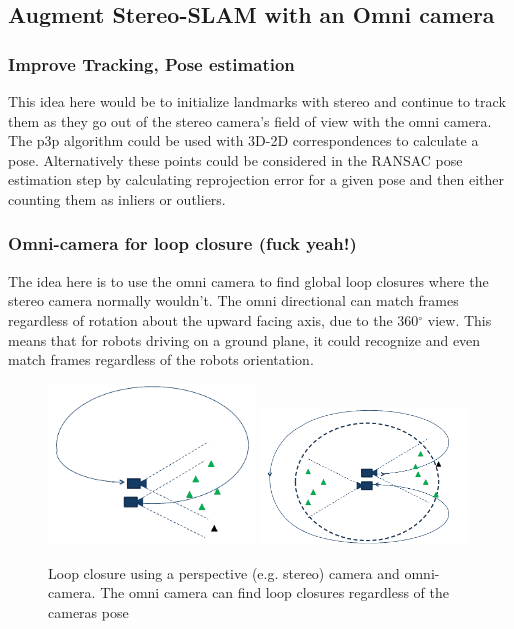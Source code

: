 \subsection{Augment Stereo-SLAM with an Omni camera}

\subsubsection{Improve Tracking, Pose estimation}

This idea here would be to initialize landmarks with stereo and continue to track them as they go out of the stereo camera's field of view with the omni camera.  The p3p algorithm could be used with 3D-2D correspondences to calculate a pose.  Alternatively these points could be considered in the RANSAC pose estimation step by calculating reprojection error for a given pose and then either counting them as inliers or outliers.

\subsubsection{Omni-camera for loop closure (fuck yeah!)}

The idea here is to use the omni camera to find global loop closures where the stereo camera normally wouldn't.  The omni directional can match frames regardless of rotation about the upward facing axis, due to the 360$^{\circ}$ view.  This means that for robots driving on a ground plane, it could recognize and even match frames regardless of the robots orientation.

\begin{figure}[h!]
  \centering
    \includegraphics[width=0.49\textwidth]{chapters/images/stereo_loop}
    \includegraphics[width=0.49\textwidth]{chapters/images/omni_loop} 
    \caption{Loop closure using a perspective (e.g. stereo) camera and omni-camera.  The omni camera can find loop closures regardless of the cameras pose}
  \label{fig:double_window}
\end{figure}

